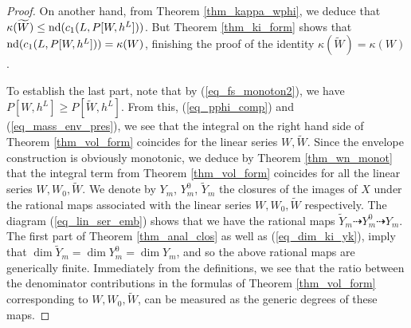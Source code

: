 \documentclass[12pt]{article}
\numberwithin{equation}{section}
\theoremstyle{theorem}
\theoremstyle{definition}
\theoremstyle{remark}
\begin{document}
\begin{proof}
		On another hand, from Theorem \ref{thm_kappa_wphi}, we deduce that $\kappa(\widetilde{W}) \leq {\rm{nd}}(c_1(L, P[W, h^L]))$.
		But Theorem \ref{thm_ki_form} shows that  ${\rm{nd}}(c_1(L, P[W, h^L])) = \kappa(W)$, finishing the proof of the identity $\kappa(\widetilde{W}) = \kappa(W)$.
		\par 
		To establish the last part, note that by (\ref{eq_fs_monoton2}), we have $P[W, h^L] \geq P[\widetilde{W}, h^L]$.
		From this, (\ref{eq_pphi_comp}) and (\ref{eq_mass_env_pres}), we see that the integral on the right hand side of Theorem \ref{thm_vol_form} coincides for the linear series $W, \widetilde{W}$.
		Since the envelope construction is obviously monotonic, we deduce by Theorem \ref{thm_wn_monot} that the integral term from Theorem \ref{thm_vol_form} coincides for all the linear series $W, W_0, \widetilde{W}$.
		We denote by $Y_m$, $Y_m^0$, $\widetilde{Y}_m$ the closures of the images of $X$ under the rational maps associated with the linear series $W, W_0, \widetilde{W}$ respectively.
		The diagram (\ref{eq_lin_ser_emb}) shows that we have the rational maps $\widetilde{Y}_m \dashrightarrow Y_m^0 \dashrightarrow Y_m$.
		The first part of Theorem \ref{thm_anal_clos} as well as (\ref{eq_dim_ki_yk}), imply that $\dim \widetilde{Y}_m = \dim Y_m^0 = \dim Y_m$, and so the above rational maps are generically finite.
		Immediately from the definitions, we see that the ratio between the denominator contributions in the formulas of Theorem \ref{thm_vol_form} corresponding to $W, W_0, \widetilde{W}$, can be measured as the generic degrees of these maps.
	\end{proof}
	
	
	
\end{document}
